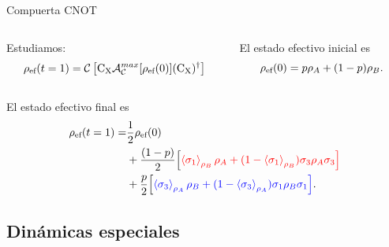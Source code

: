 \begin{frame}{Compuerta CNOT}
    \begin{columns}
        \begin{column}{0.5\textwidth}
            Estudiamos:
            \begin{equation}
                \rho_{\text{ef}}(t=1)=\mathcal{C}\left[\text{C}_{\text{X}} \mathcal{A}_{\mathcal{C}}^{max}[\rho_{\text{ef}}(0)](\text{C}_{\text{X}})^{\dag}\right]\nonumber
            \end{equation}
        \end{column}\pause
        \begin{column}{0.5\textwidth}
            El estado efectivo inicial es
            \begin{equation}
                \rho_{\text{ef}}(0)=p\rho_{A}+(1-p)\rho_{B}.\nonumber
            \end{equation}
        \end{column}\pause
    \end{columns}
    El estado efectivo final es\pause
    \begin{align*}
        \rho_{\text{ef}}(t=1)=&\frac{1}{2}\rho_{\text{ef}}(0)\\
        &+\frac{(1-p)}{2}\qty[{\color{red}\expval{\sigma_{1}}_{\rho_{B}}\rho_{A}+(1-\expval{\sigma_{1}}_{\rho_{B}})\sigma_{3}\rho_{A}\sigma_{3}}]\\
        &+\frac{p}{2}\qty[{\color{blue}\expval{\sigma_{3}}_{\rho_{A}}\rho_{B}+(1-\expval{\sigma_{3}}_{\rho_{A}})\sigma_{1}\rho_{B}\sigma_{1}}].
    \end{align*}\pause
\end{frame}


\subsection{Dinámicas especiales}

